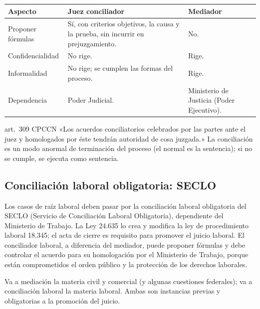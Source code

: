 \documentclass[12pt,oneside]{book}
\renewcommand{\arraystretch}{1.15}
\begin{document}
\begin{table}[H]
\centering
\renewcommand{\arraystretch}{1.25}
\begin{tabularx}{\textwidth}{>{\RaggedRight\arraybackslash}p{}>{\RaggedRight\arraybackslash}X>{\RaggedRight\arraybackslash}X}
\toprule
\textbf{Aspecto} & \textbf{Juez conciliador} & \textbf{Mediador} \\
\midrule
Proponer fórmulas & Sí, con criterios objetivos, la causa y la prueba, sin incurrir en prejuzgamiento. & No. \\
Confidencialidad & No rige. & Rige. \\
Informalidad & No rige; se cumplen las formas del proceso. & Rige. \\
Dependencia & Poder Judicial. & Ministerio de Justicia (Poder Ejecutivo). \\
\bottomrule
\end{tabularx}
\end{table}

\begin{norma}{art.~309 CPCCN}
«Los acuerdos conciliatorios celebrados por las partes ante el juez y homologados por éste tendrán autoridad de cosa juzgada.» La conciliación es un modo anormal de terminación del proceso (el normal es la sentencia); si no se cumple, se ejecuta como sentencia.
\end{norma}

\subsection{Conciliación laboral obligatoria: SECLO}

Los casos de raíz laboral deben pasar por la conciliación laboral obligatoria del SECLO (Servicio de Conciliación Laboral Obligatoria), dependiente del Ministerio de Trabajo. La Ley 24.635 lo crea y modifica la ley de procedimiento laboral 18.345; el acta de cierre es requisito para promover el juicio laboral. El conciliador laboral, a diferencia del mediador, puede proponer fórmulas y debe controlar el acuerdo para su homologación por el Ministerio de Trabajo, porque están comprometidos el orden público y la protección de los derechos laborales.

\begin{important}
Va a mediación la materia civil y comercial (y algunas cuestiones federales); va a conciliación laboral la materia laboral. Ambas son instancias previas y obligatorias a la promoción del juicio.
\end{important}
\end{document}
